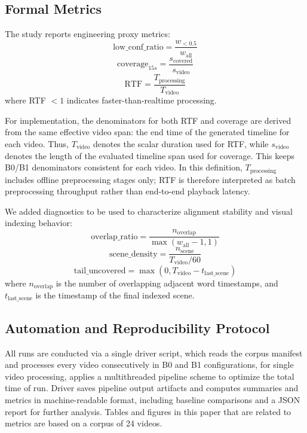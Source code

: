 ﻿\documentclass[conference]{IEEEtran}
\begin{document}
\subsection{Formal Metrics}
The study reports engineering proxy metrics:
\begin{equation}
\text{low\_conf\_ratio} = \frac{w_{<0.5}}{w_{\text{all}}}
\end{equation}
\begin{equation}
\text{coverage}_{15s} = \frac{s_{\text{covered}}}{s_{\text{video}}}
\end{equation}
\begin{equation}
\text{RTF} = \frac{T_{\text{processing}}}{T_{\text{video}}}
\end{equation}
where RTF $< 1$ indicates faster-than-realtime processing.

For implementation, the denominators for both RTF and coverage are derived from the same effective video span: the end time of the generated timeline for each video. Thus, $T_{\text{video}}$ denotes the scalar duration used for RTF, while $s_{\text{video}}$ denotes the length of the evaluated timeline span used for coverage. This keeps B0/B1 denominators consistent for each video. In this definition, $T_{\text{processing}}$ includes offline preprocessing stages only; RTF is therefore interpreted as batch preprocessing throughput rather than end-to-end playback latency.

We added diagnostics to be used to characterize alignment stability and visual indexing behavior:
\begin{equation}
\text{overlap\_ratio} = \frac{n_{\text{overlap}}}{\max(w_{\text{all}}-1,1)}
\end{equation}
\begin{equation}
\text{scene\_density} = \frac{n_{\text{scene}}}{T_{\text{video}}/60}
\end{equation}
\begin{equation}
\text{tail\_uncovered} = \max(0, T_{\text{video}} - t_{\text{last\_scene}})
\end{equation}
where $n_{\text{overlap}}$ is the number of overlapping adjacent word timestamps, and $t_{\text{last\_scene}}$ is the timestamp of the final indexed scene.

\subsection{Automation and Reproducibility Protocol}
All runs are conducted via a single driver script, which reads the corpus manifest and processes every video consecutively in B0 and B1 configurations, for single video processing, applies a multithreaded pipeline scheme to optimize the total time of run. Driver saves pipeline output artifacts and computes summaries and metrics in machine-readable format, including baseline comparisons and a JSON report for further analysis. Tables and figures in this paper that are related to metrics are based on a corpus of 24 videos.
\end{document}
